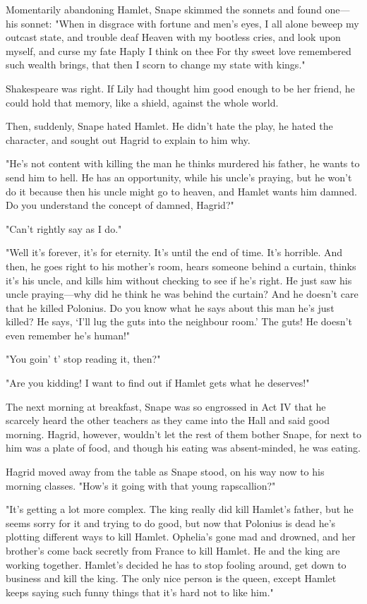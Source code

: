 Momentarily abandoning Hamlet, Snape skimmed the sonnets and found one—his sonnet: "When in disgrace with fortune and men's eyes, I all alone beweep my outcast state, and trouble deaf Heaven with my bootless cries, and look upon myself, and curse my fate{\el} Haply I think on thee{\el} For thy sweet love remembered such wealth brings, that then I scorn to change my state with kings."

Shakespeare was right. If Lily had thought him good enough to be her friend, he could hold that memory, like a shield, against the whole world.

Then, suddenly, Snape hated Hamlet. He didn't hate the play, he hated the character, and sought out Hagrid to explain to him why.

"He's not content with killing the man he thinks murdered his father, he wants to send him to hell. He has an opportunity, while his uncle's praying, but he won't do it because then his uncle might go to heaven, and Hamlet wants him damned. Do you understand the concept of damned, Hagrid?"

"Can't rightly say as I do."

"Well it's forever, it's for eternity. It's until the end of time. It's horrible. And then, he goes right to his mother's room, hears someone behind a curtain, thinks it's his uncle, and kills him without checking to see if he's right. He just saw his uncle praying—why did he think he was behind the curtain? And he doesn't care that he killed Polonius. Do you know what he says about this man he's just killed? He says, `I'll lug the guts into the neighbour room.' The guts! He doesn't even remember he's human!"

"You goin' t' stop reading it, then?"

"Are you kidding! I want to find out if Hamlet gets what he deserves!"

The next morning at breakfast, Snape was so engrossed in Act IV that he scarcely heard the other teachers as they came into the Hall and said good morning. Hagrid, however, wouldn't let the rest of them bother Snape, for next to him was a plate of food, and though his eating was absent-minded, he was eating.

Hagrid moved away from the table as Snape stood, on his way now to his morning classes. "How's it going with that young rapscallion?"

"It's getting a lot more complex. The king really did kill Hamlet's father, but he seems sorry for it and trying to do good, but now that Polonius is dead he's plotting different ways to kill Hamlet. Ophelia's gone mad and drowned, and her brother's come back secretly from France to kill Hamlet. He and the king are working together. Hamlet's decided he has to stop fooling around, get down to business and kill the king. The only nice person is the queen, except Hamlet keeps saying such funny things that it's hard not to like him."

